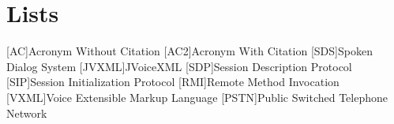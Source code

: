 \appendix
\renewcommand{\appendixtocname}{Appendix}
\renewcommand{\appendixpagename}{\appendixtocname}
\addappheadtotoc
{}
\appendixpage

\chapter{Lists}
\begin{acronym}[\hspace{3cm}]
  [AC]{Acronym Without Citation}
  [AC2]{Acronym With Citation \cite{citeKey2}}
  [SDS]{Spoken Dialog System}
  [JVXML]{JVoiceXML}
  [SDP]{Session Description Protocol}
  [SIP]{Session Initialization Protocol}
  [RMI]{Remote Method Invocation}
  [VXML]{Voice Extensible Markup Language}
  [PSTN]{Public Switched Telephone Network}
\end{acronym}
\clearpage
\listoffigures
{}
\lstlistoflistings
{}
